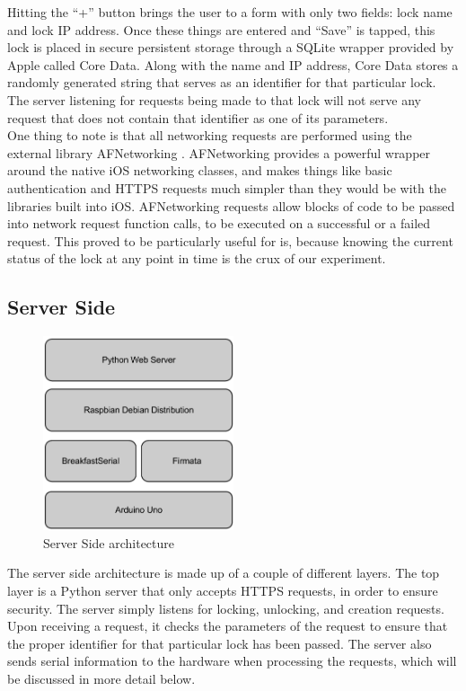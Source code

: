 \documentclass[10pt]{article}
\begin{document}
\begin{multicols}{2}
Hitting the ``+'' button brings the user to a form with only two fields: lock name and lock IP address. Once these things are entered and ``Save'' is tapped, this lock is placed in secure persistent storage through a SQLite wrapper provided by Apple called Core Data. Along with the name and IP address, Core Data stores a randomly generated string that serves as an identifier for that particular lock. The server listening for requests being made to that lock will not serve any request that does not contain that identifier as one of its parameters. \\

One thing to note is that all networking requests are performed using the external library AFNetworking \cite{afnetworking}. AFNetworking provides a powerful wrapper around the native iOS networking classes, and makes things like basic authentication and HTTPS requests much simpler than they would be with the libraries built into iOS. AFNetworking requests allow blocks of code to be passed into network request function calls, to be executed on a successful or a failed request. This proved to be particularly useful for is, because knowing the current status of the lock at any point in time is the crux of our experiment. \\

\subsection{Server Side}
\begin{figure}[H]
\centering
\includegraphics[width=0.5\textwidth]{stack.png}
\caption{Server Side architecture}
\end{figure}

The server side architecture is made up of a couple of different layers. The top layer is a Python server that only accepts HTTPS requests, in order to ensure security. The server simply listens for locking, unlocking, and creation requests. Upon receiving a request, it checks the parameters of the request to ensure that the proper identifier for that particular lock has been passed. The server also sends serial information to the hardware when processing the requests, which will be discussed in more detail below. \\


\end{multicols}
\end{document}
